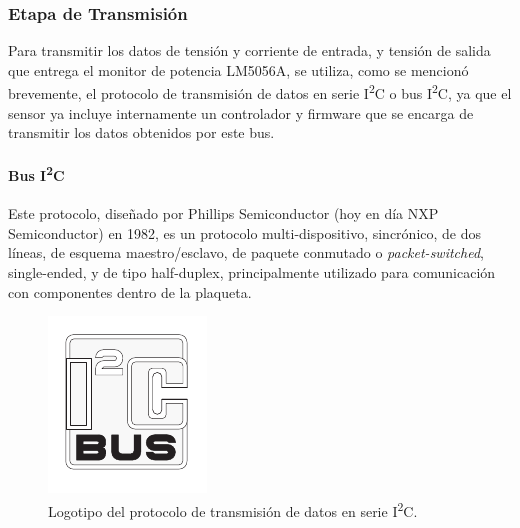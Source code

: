 \subsubsection{Etapa de Transmisión}

Para transmitir los datos de tensión y corriente de entrada, y tensión de salida que entrega el monitor de potencia LM5056A, se utiliza, como se mencionó brevemente, el protocolo de transmisión de datos en serie I\textsuperscript{2}C o bus I\textsuperscript{2}C, ya que el sensor ya incluye internamente un controlador y firmware que se encarga de transmitir los datos obtenidos por este bus.\\

\paragraph{Bus I\textsuperscript{2}C}

Este protocolo, diseñado por Phillips Semiconductor (hoy en día NXP Semiconductor) en 1982, es un protocolo multi-dispositivo, sincrónico, de dos líneas, de esquema maestro/esclavo, de paquete conmutado o \textit{packet-switched}, single-ended, y de tipo half-duplex, principalmente utilizado para comunicación con componentes dentro de la plaqueta.\\

\begin{figure}[h]
    \centering
    \includegraphics[scale=0.9]{Imagenes/Logo I2C.pdf}
    \caption{Logotipo del protocolo de transmisión de datos en serie I\textsuperscript{2}C.}
    \label{logo_I2C}
\end{figure}

